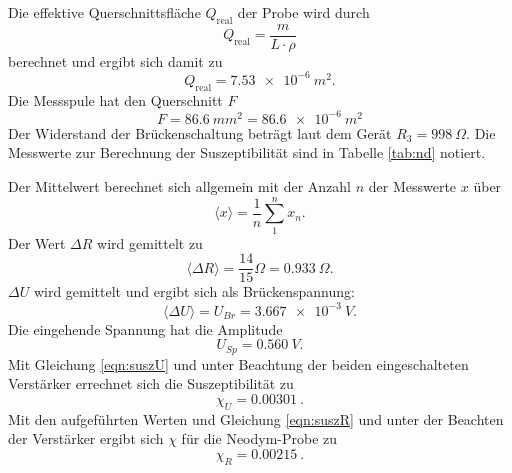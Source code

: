 Die effektive Querschnittsfläche $Q_{\text{real}}$ der Probe wird durch
\begin{equation*}
  Q_{\text{real}}= \frac{m}{L \cdot \rho}
\end{equation*}
berechnet und ergibt sich damit zu
\begin{equation*}
  Q_{\text{real}}= \SI{7.53e-6}{m^2}.
\end{equation*}
Die Messspule hat den Querschnitt $F$
\begin{equation*}
  F=\SI{86.6}{mm^2}=\SI{86.6e-6}{m^2}
\end{equation*}
Der Widerstand der Brückenschaltung beträgt laut dem Gerät $R_3=\SI{998}{\Omega}$.
Die Messwerte zur Berechnung der Suszeptibilität sind in Tabelle \ref{tab:nd} notiert.

Der Mittelwert berechnet sich allgemein mit der Anzahl $n$ der Messwerte $x$ über
\begin{equation*}
  \langle x \rangle= \frac{1}{n}\sum_{1}^{n}x_n.
\end{equation*}
Der Wert $\Delta R$ wird gemittelt zu
\begin{equation*}
  \langle \Delta R \rangle =\frac{14}{15} \Omega = \SI{0.933}{\Omega}.
\end{equation*}
$\Delta U$ wird gemittelt und ergibt sich als Brückenspannung:
\begin{equation*}
 \langle \Delta U \rangle =U_{Br} = \SI{3.667e-3}{V}.
\end{equation*}
Die eingehende Spannung hat die Amplitude
\begin{equation*}
  U_{Sp}= \SI{0.560}{V}.
\end{equation*}
Mit Gleichung \eqref{eqn:suszU} und unter Beachtung der beiden eingeschalteten Verstärker errechnet sich die Suszeptibilität zu
\begin{equation*}
  \chi_{U}=\SI{0.00301}{}.
\end{equation*}
Mit den aufgeführten Werten und Gleichung \eqref{eqn:suszR} und unter der Beachten der Verstärker ergibt sich $\chi$ für die Neodym-Probe zu
\begin{equation*}
  \chi_{R}=\SI{0.00215}{}.
\end{equation*}

\FloatBarrier
